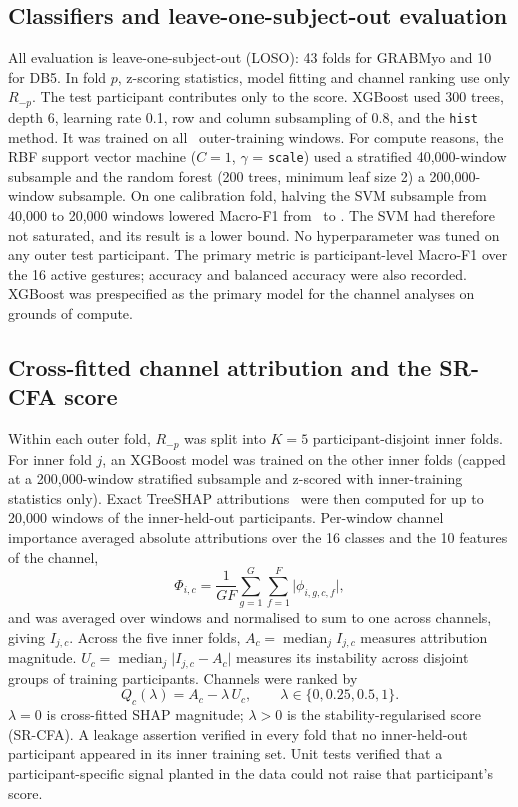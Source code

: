 \subsection{Classifiers and leave-one-subject-out evaluation}
All evaluation is leave-one-subject-out (LOSO): 43 folds for GRABMyo and 10 for DB5. In fold $p$, z-scoring statistics, model fitting and channel ranking use only $R_{-p}$. The test participant contributes only to the score. XGBoost used 300 trees, depth 6, learning rate 0.1, row and column subsampling of 0.8, and the \texttt{hist} method. It was trained on all \FoldTrainingWindows\ outer-training windows. For compute reasons, the RBF support vector machine ($C = 1$, $\gamma$ = \texttt{scale}) used a stratified 40,000-window subsample and the random forest (200 trees, minimum leaf size 2) a 200,000-window subsample. On one calibration fold, halving the SVM subsample from 40,000 to 20,000 windows lowered Macro-F1 from \SVMCalibFortyK\ to \SVMCalibTwentyK. The SVM had therefore not saturated, and its result is a lower bound. No hyperparameter was tuned on any outer test participant. The primary metric is participant-level Macro-F1 over the 16 active gestures; accuracy and balanced accuracy were also recorded. XGBoost was prespecified as the primary model for the channel analyses on grounds of compute.

\subsection{Cross-fitted channel attribution and the SR-CFA score}
Within each outer fold, $R_{-p}$ was split into $K = 5$ participant-disjoint inner folds. For inner fold $j$, an XGBoost model was trained on the other inner folds (capped at a 200,000-window stratified subsample and z-scored with inner-training statistics only). Exact TreeSHAP attributions~\cite{lundberg2020local} were then computed for up to 20,000 windows of the inner-held-out participants. Per-window channel importance averaged absolute attributions over the 16 classes and the 10 features of the channel,
\begin{equation}
\Phi_{i,c} = \frac{1}{G F}\sum_{g=1}^{G}\sum_{f=1}^{F} \lvert \phi_{i,g,c,f} \rvert ,
\end{equation}
and was averaged over windows and normalised to sum to one across channels, giving $I_{j,c}$. Across the five inner folds, $A_c = \operatorname{median}_j I_{j,c}$ measures attribution magnitude. $U_c = \operatorname{median}_j \lvert I_{j,c} - A_c \rvert$ measures its instability across disjoint groups of training participants. Channels were ranked by
\begin{equation}
Q_c(\lambda) = A_c - \lambda\, U_c , \qquad \lambda \in \{0, 0.25, 0.5, 1\}.
\label{eq:srcfa}
\end{equation}
$\lambda = 0$ is cross-fitted SHAP magnitude; $\lambda > 0$ is the stability-regularised score (SR-CFA). A leakage assertion verified in every fold that no inner-held-out participant appeared in its inner training set. Unit tests verified that a participant-specific signal planted in the data could not raise that participant's score.

